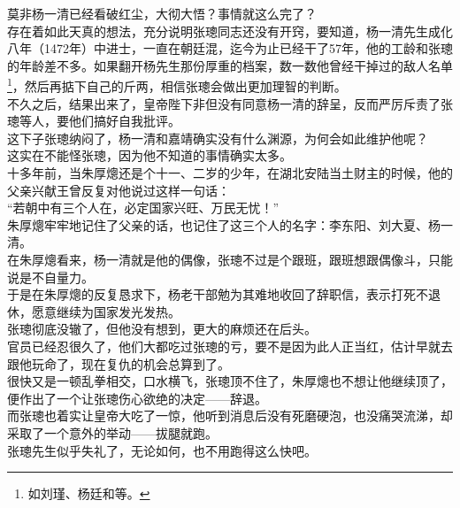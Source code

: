 \begin{multicols}{\theparacolNo}
莫非杨一清已经看破红尘，大彻大悟？事情就这么完了？\\

存在着如此天真的想法，充分说明张璁同志还没有开窍，要知道，杨一清先生成化八年（1472年）中进士，一直在朝廷混，迄今为止已经干了57年，他的工龄和张璁的年龄差不多。如果翻开杨先生那份厚重的档案，数一数他曾经干掉过的敌人名单\footnote{如刘瑾、杨廷和等。}，然后再掂下自己的斤两，相信张璁会做出更加理智的判断。\\

不久之后，结果出来了，皇帝陛下非但没有同意杨一清的辞呈，反而严厉斥责了张璁等人，要他们搞好自我批评。\\

这下子张璁纳闷了，杨一清和嘉靖确实没有什么渊源，为何会如此维护他呢？\\

这实在不能怪张璁，因为他不知道的事情确实太多。\\

十多年前，当朱厚熜还是个十一、二岁的少年，在湖北安陆当土财主的时候，他的父亲兴献王曾反复对他说过这样一句话：\\

“若朝中有三个人在，必定国家兴旺、万民无忧！”\\

朱厚熜牢牢地记住了父亲的话，也记住了这三个人的名字：李东阳、刘大夏、杨一清。\\

在朱厚熜看来，杨一清就是他的偶像，张璁不过是个跟班，跟班想跟偶像斗，只能说是不自量力。\\

于是在朱厚熜的反复恳求下，杨老干部勉为其难地收回了辞职信，表示打死不退休，愿意继续为国家发光发热。\\

张璁彻底没辙了，但他没有想到，更大的麻烦还在后头。\\

官员已经忍很久了，他们大都吃过张璁的亏，要不是因为此人正当红，估计早就去跟他玩命了，现在复仇的机会总算到了。\\

很快又是一顿乱拳相交，口水横飞，张璁顶不住了，朱厚熜也不想让他继续顶了，便作出了一个让张璁伤心欲绝的决定——辞退。\\

而张璁也着实让皇帝大吃了一惊，他听到消息后没有死磨硬泡，也没痛哭流涕，却采取了一个意外的举动——拔腿就跑。\\

张璁先生似乎失礼了，无论如何，也不用跑得这么快吧。\\


\end{multicols}
